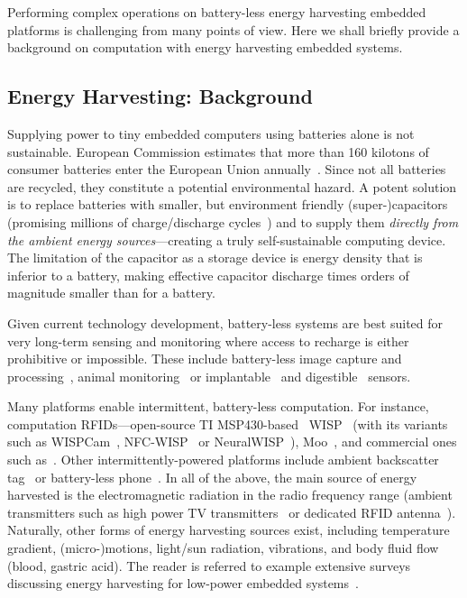 Performing complex operations on battery-less energy harvesting embedded platforms is challenging from many points of view. Here we shall briefly provide a background on computation with energy harvesting embedded systems. 

\subsection{Energy Harvesting: Background}
\label{sec:background_harvesting}

Supplying power to tiny embedded computers using batteries alone is not sustainable. European Commission estimates that more than 160 kilotons of consumer batteries enter the European Union annually~\cite{eu_batteries_2016}. Since not all batteries are recycled, they constitute a potential environmental hazard. A potent solution is to replace batteries with smaller, but environment friendly {(super-)capacitors} (promising millions of charge/discharge cycles~\cite[Sec. I]{ongaro_pwre_2012}) and to supply them {\em directly from the ambient energy sources}---creating a truly self-sustainable computing device. The limitation of the capacitor as a storage device is energy density that is inferior to a battery, making effective capacitor discharge times orders of magnitude smaller than for a battery.

Given current technology development, battery-less systems are best suited for very long-term sensing and monitoring where access to recharge is either prohibitive or impossible. These include battery-less image capture and processing~\cite{naderiparizi_rfid_2015}, animal monitoring~\cite{thomas_jbcs_2012} or implantable~\cite{rodriguez_tbcs_2015} and digestible~\cite{nadeau_naturebio_2017} sensors.

Many platforms enable intermittent, battery-less computation. For instance, computation RFIDs---open-source TI MSP430-based~\cite{wolverine} WISP~\cite{wisp5} (with its variants such as WISPCam~\cite{naderiparizi_rfid_2015}, NFC-WISP~\cite{zhao_rfid_2015} or NeuralWISP~\cite{holleman_biocas_2008}), Moo~\cite{moo}, and commercial ones such as~\cite{medusa_farsens_2017}. Other intermittently-powered platforms include ambient backscatter tag~\cite{liu_sigcomm_2013,parks_sigcomm_2014} or battery-less phone~\cite{talla_imwut_2017}. In all of the above, the main source of energy harvested is the electromagnetic radiation in the radio frequency range (ambient transmitters such as high power TV transmitters~\cite{liu_sigcomm_2013} or dedicated RFID antenna~\cite{wisp5,moo,talla_imwut_2017,medusa_farsens_2017,holleman_biocas_2008,naderiparizi_rfid_2015}). Naturally, other forms of energy harvesting sources exist, including temperature gradient, (micro-)motions, light/sun radiation, vibrations, and body fluid flow (blood, gastric acid). The reader is referred to example extensive surveys discussing energy harvesting for low-power embedded systems~\cite{paradiso_pvc_2005,soyata_csm_2016,prasad_comst_2014,ku_cst_2016}.

